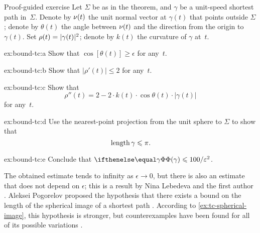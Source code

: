 \begin{thm}{Proof-guided exercise}\label{ex:bound-tc}
Let $\Sigma$ be as in the theorem, and $\gamma$ be a unit-speed shortest path in~$\Sigma$.
Denote by $\nu(t)$ the unit normal vector at $\gamma(t)$ that points outside $\Sigma$;
denote by $\theta(t)$ the angle between $\nu(t)$ and the direction from the origin to $\gamma(t)$.
Set $\rho(t)\z=|\gamma(t)|^2$; denote by $k(t)$ the curvature of $\gamma$ at~$t$.

\begin{subthm}{ex:bound-tc:a}
Show that $\cos[\theta(t)]\ge \epsilon$ for any~$t$.
\end{subthm}

\begin{subthm}{ex:bound-tc:b}
 Show that $|\rho'(t)|\le 2$ for any~$t$.
\end{subthm}

\begin{subthm}{ex:bound-tc:c}
 Show that 
\[\rho''(t)=2-2\cdot k(t)\cdot \cos \theta(t)\cdot |\gamma(t)|\]
for any~$t$.
\end{subthm}

\begin{subthm}{ex:bound-tc:d}
 Use the nearest-point projection from the unit sphere to $\Sigma$ to show that 
\[\mathop{\rm length}\nolimits \gamma\leqslant \pi.\]
\end{subthm}

\begin{subthm}{ex:bound-tc:e}
Conclude that $\tc\gamma\le 100/\epsilon^2$.
\end{subthm}

\end{thm}

The obtained estimate tends to infinity as $\epsilon \to 0$,
but there is also an estimate that does not depend on $\epsilon$;
this is a result by Nina Lebedeva and the first author \cite{lebedeva-petrunin}.
Aleksei Pogorelov proposed the hypothesis that there exists a bound on the length of the spherical image of a shortest path \cite{pogorelov}.
According to \ref{ex:tc-spherical-image}, this hypothesis is stronger,
but counterexamples have been found for all of its possible variations \cite{zalgaller,milka,usov,pach}.
